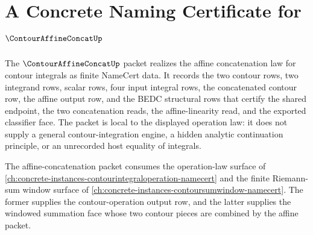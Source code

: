 \chapter{A Concrete Naming Certificate for $\ContourAffineConcatUp$}
\label{ch:concrete-instances-contouraffineconcat-namecert}

The $\ContourAffineConcatUp$ packet realizes the affine concatenation law for contour integrals as finite NameCert data. It records the two contour rows, two integrand rows, scalar rows, four input integral rows, the concatenated contour row, the affine output row, and the BEDC structural rows that certify the shared endpoint, the two concatenation reads, the affine-linearity read, and the exported classifier face. The packet is local to the displayed operation law: it does not supply a general contour-integration engine, a hidden analytic continuation principle, or an unrecorded host equality of integrals.

The affine-concatenation packet consumes the operation-law surface of \autoref{ch:concrete-instances-contourintegraloperation-namecert} and the finite Riemann-sum window surface of \autoref{ch:concrete-instances-contoursumwindow-namecert}. The former supplies the contour-operation output row, and the latter supplies the windowed summation face whose two contour pieces are combined by the affine packet.


